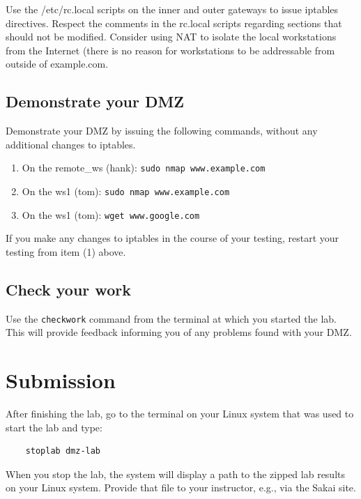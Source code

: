 Use the /etc/rc.local scripts on the inner and outer gateways to issue iptables directives.
Respect the comments in the rc.local scripts regarding sections that should not be modified.
Consider using NAT to isolate the local workstations from the Internet (there is no reason
for workstations to be addressable from outside of example.com.

\subsection{Demonstrate your DMZ}
Demonstrate your DMZ by issuing the following commands, without any additional changes to iptables.
\begin{enumerate}
\item On the remote\_ws (hank): {\tt sudo nmap www.example.com}
\item On the ws1 (tom): {\tt sudo nmap www.example.com}
\item On the ws1 (tom): {\tt wget www.google.com}
\end{enumerate}
\noindent If you make any changes to iptables in the course of your testing, restart your testing from
item (1) above.

\subsection{Check your work}
Use the {\tt checkwork} command from the terminal at which you started the lab.  This will provide
feedback informing you of any problems found with your DMZ.

\section{Submission}
After finishing the lab, go to the terminal on your Linux system that was used to start the lab and type:
\begin{verbatim}
    stoplab dmz-lab
\end{verbatim}
When you stop the lab, the system will display a path to the zipped lab results on your Linux system.  Provide that file to 
your instructor, e.g., via the Sakai site.


